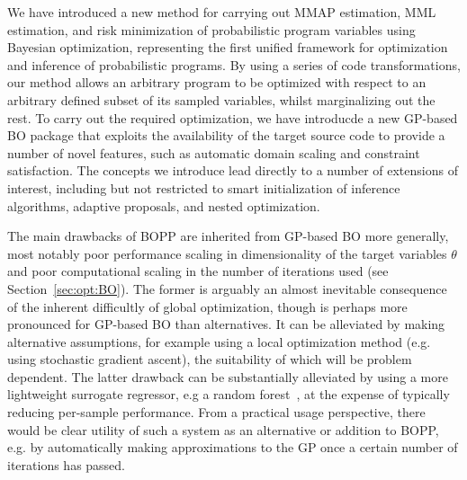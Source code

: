 
We have introduced a new method for carrying out MMAP estimation, MML estimation, and risk minimization
of probabilistic program variables using Bayesian optimization, representing the first unified framework for 
optimization and inference of probabilistic programs.  By using a series of code transformations, 
our method allows an arbitrary program to be optimized with respect to an arbitrary defined subset of its sampled variables, 
whilst marginalizing out the rest.  To carry out the required optimization, we have introducde a new GP-based 
BO package that exploits the availability of the target source code to provide a number of novel features, 
such as automatic domain scaling and constraint satisfaction.  
The concepts we introduce lead directly to a number of extensions of interest, including but not restricted 
to smart initialization of inference algorithms, adaptive proposals, and nested optimization.

The main drawbacks of BOPP are inherited from GP-based BO more generally,
most notably poor performance scaling in dimensionality of the target variables $\theta$ and poor 
computational scaling in the number of iterations used (see Section~\ref{sec:opt:BO}).  The former is 
arguably an almost inevitable consequence of the inherent difficultly of global optimization, though is perhaps
more pronounced for GP-based BO than alternatives.  It can be alleviated by making alternative
assumptions, for example using a local optimization method (e.g. using stochastic gradient ascent), the
suitability of which will be problem dependent.  The latter drawback can be substantially alleviated by using
a more lightweight surrogate regressor, e.g a random forest~\citep{hutter2011sequential}, 
at the expense of typically reducing per-sample performance.  From
a practical usage perspective, there would be clear utility of such a system as an alternative or addition to BOPP, e.g. by automatically
making approximations to the GP once a certain number of iterations has passed.

